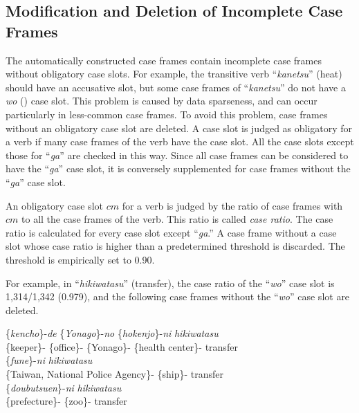\documentclass[english]{jnlp_1.4_rep}
\newcommand{\nom}{}
\newcommand{\acc}{}
\newcommand{\dat}{}
\newcommand{\gen}{}
\newcommand{\loc}{}
\begin{document}
\subsection{Modification and Deletion of Incomplete Case Frames}

The automatically constructed case frames contain incomplete case
frames without obligatory case slots. For example, the transitive verb
``\textit{kanetsu}'' (heat) should have an accusative slot, but some case frames
of ``\textit{kanetsu}'' do not have a \textit{wo} (\acc) case
slot. This problem is caused by data sparseness, and can occur
particularly in less-common case frames. To avoid this problem, case
frames without an obligatory case slot are deleted. A case slot is judged
as obligatory for a verb if many case frames of the verb have the
case slot. All the case slots except those for ``\textit{ga}'' are checked in
this way. Since all case frames can be considered to have the
``\textit{ga}'' case slot, it is conversely
supplemented for case frames without the ``\textit{ga}'' case slot.

An obligatory case slot $cm$ for a verb is judged by the ratio of case
frames with $cm$ to all the case frames of the verb.  This ratio is
called \textit{case ratio}. The case ratio is calculated for every case
slot except ``\textit{ga}.'' A case frame without a case slot whose
case ratio is higher than a predetermined threshold is discarded. The threshold is
empirically set to 0.90.

For example, in ``\textit{hikiwatasu}'' (transfer), the case
ratio of the ``\textit{wo}'' case slot is 1,314/1,342 (0.979), and the following
case frames without the ``\textit{wo}'' case slot are deleted.

\begin{exe}
\ex
 \begin{xlist}
 \ex
   {\{\textit{kencho}\}-\textit{de}} {\{\textit{Yonago}\}-\textit{no}} {\{\textit{hokenjo}\}-\textit{ni}} {\textit{hikiwatasu}} \\
       {\{keeper\}-\nom} {\{office\}-\loc} {\{Yonago\}-\gen} {\{health center\}-\dat} {transfer} \\
 \ex
   {\{\textit{fune}\}-\textit{ni}} {\textit{hikiwatasu}} \\
       {\{Taiwan, National Police Agency\}-\gen} {\{ship\}-\dat} {transfer} \\
 \ex
   {\{\textit{doubutsuen}\}-\textit{ni}} {\textit{hikiwatasu}} \\
       {\{prefecture\}-\gen} {\{zoo\}-\dat} {transfer} \\
 \end{xlist}
\end{exe}
\end{document}
